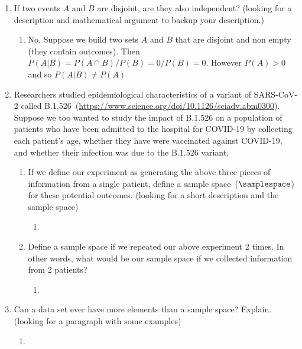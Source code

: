 \documentclass[krantz1,ChapterTOCs]{krantz}
\begin{document}
\begin{enumerate}
   \item If two events $A$ and $B$ are disjoint, are they also independent? (looking for a description and mathematical argument to backup your description.)
   \begin{enumerate}
        \item {\color{red} No. Suppose we build two sets $A$ and $B$ that are disjoint and non empty (they contain outcomes). Then $P(A|B) = P(A \cap B) / P(B) = 0/P(B) = 0 $. However $P(A) > 0$ and so $P(A|B) \neq P(A)$      }
    \end{enumerate}
   
   \item Researchers studied epidemiological characteristics of a variant of SARS-CoV-2 called B.1.526~(\url{https://www.science.org/doi/10.1126/sciadv.abm0300}). Suppose we too wanted to study the impact of B.1.526 on a population of patients who have been admitted to the hospital for COVID-19 by collecting each patient's age, whether they have were vaccinated against COVID-19, and whether their infection was due to the B.1.526 variant.
   
   \begin{enumerate}
       \item If we define our experiment as generating the above three pieces of information from a single patient, define a sample space~($\samplespace$) for these potential outcomes. (looking for a short description and the sample space)
       \begin{enumerate}
           \item {\color{red}     }
       \end{enumerate}
       \item Define a sample space if we repeated our above experiment 2 times. In other words, what would be our sample space if we collected information from 2 patients? 
       \begin{enumerate}
           \item {\color{red}     }
       \end{enumerate}
   \end{enumerate}
    
   \item Can a data set ever have more elements than a sample space? Explain. (looking for a paragraph with some examples)
   \begin{enumerate}
           \item {\color{red}     }
       \end{enumerate}
   

\end{enumerate}
\end{document}
